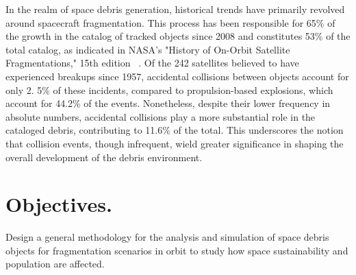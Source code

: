 \documentclass[11pt]{article} %
\begin{document}
In the realm of space debris generation, historical trends have primarily revolved around spacecraft fragmentation. This process has been responsible for 65\% of the growth in the catalog of tracked objects since 2008 and constitutes 53\% of the total catalog, as indicated in NASA's "History of On-Orbit Satellite Fragmentations," 15th edition ~\cite{anz-meador_assessment_2004}. Of the 242 satellites believed to have experienced breakups since 1957, accidental collisions between objects account for only 2. 5\% of these incidents, compared to propulsion-based explosions, which account for 44.2\% of the events. Nonetheless, despite their lower frequency in absolute numbers, accidental collisions play a more substantial role in the cataloged debris, contributing to 11.6\% of the total. This underscores the notion that collision events, though infrequent, wield greater significance in shaping the overall development of the debris environment.

\section{Objectives.}

Design a general methodology for the analysis and simulation of space debris objects for fragmentation scenarios in orbit to study how space sustainability and population are affected.
\end{document}
